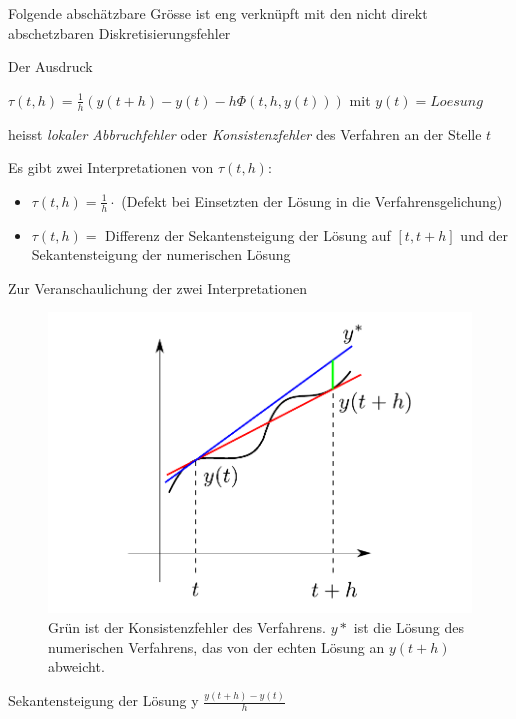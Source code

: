 \documentclass[10pt,a4paper]{article}
\begin{document}
Folgende abschätzbare Grösse ist eng verknüpft mit den nicht  direkt abschetzbaren Diskretisierungsfehler

\begin{defi}

Der Ausdruck

$\tau(t,h)=\frac{1}{h}(y(t+h)-y(t)-h\Phi(t,h,y(t)))$ mit $y(t)=Loesung$

heisst \emph{lokaler Abbruchfehler} oder \emph{Konsistenzfehler} des Verfahren an der Stelle $t$

\end{defi}


Es gibt  zwei Interpretationen von $\tau(t,h)$:

\begin{itemize}
\item $\tau(t,h) = \frac{1}{h} \cdot$ (Defekt bei Einsetzten der Lösung in die Verfahrensgelichung)
\item $\tau(t,h) = $ Differenz der Sekantensteigung der Lösung auf $[t,t+h]$ und der Sekantensteigung der numerischen Lösung
\end{itemize}

Zur Veranschaulichung der zwei Interpretationen
\begin{figure}[H]
\includegraphics[width=\textwidth]{images/konsistenzfehler}
\caption{Grün ist der Konsistenzfehler des Verfahrens. $y*$ ist die Lösung des numerischen Verfahrens, das von der echten Lösung an $y(t+h)$ abweicht.}
\end{figure}


Sekantensteigung der Lösung y $\frac{y(t+h)-y(t)}{h}$
\end{document}
